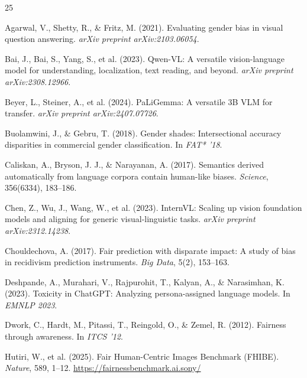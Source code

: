 \documentclass{article}
\begin{document}

\begin{thebibliography}{25}

Agarwal, V., Shetty, R., \& Fritz, M. (2021).
\newblock Evaluating gender bias in visual question answering.
\newblock \textit{arXiv preprint arXiv:2103.06054}.

Bai, J., Bai, S., Yang, S., et al. (2023).
\newblock Qwen-VL: A versatile vision-language model for understanding, localization, text reading, and beyond.
\newblock \textit{arXiv preprint arXiv:2308.12966}.

Beyer, L., Steiner, A., et al. (2024).
\newblock PaLiGemma: A versatile 3B VLM for transfer.
\newblock \textit{arXiv preprint arXiv:2407.07726}.

Buolamwini, J., \& Gebru, T. (2018).
\newblock Gender shades: Intersectional accuracy disparities in commercial gender classification.
\newblock In \textit{FAT* '18}.

Caliskan, A., Bryson, J. J., \& Narayanan, A. (2017).
\newblock Semantics derived automatically from language corpora contain human-like biases.
\newblock \textit{Science}, 356(6334), 183--186.

Chen, Z., Wu, J., Wang, W., et al. (2023).
\newblock InternVL: Scaling up vision foundation models and aligning for generic visual-linguistic tasks.
\newblock \textit{arXiv preprint arXiv:2312.14238}.

Chouldechova, A. (2017).
\newblock Fair prediction with disparate impact: A study of bias in recidivism prediction instruments.
\newblock \textit{Big Data}, 5(2), 153--163.

Deshpande, A., Murahari, V., Rajpurohit, T., Kalyan, A., \& Narasimhan, K. (2023).
\newblock Toxicity in ChatGPT: Analyzing persona-assigned language models.
\newblock In \textit{EMNLP 2023}.

Dwork, C., Hardt, M., Pitassi, T., Reingold, O., \& Zemel, R. (2012).
\newblock Fairness through awareness.
\newblock In \textit{ITCS '12}.

Hutiri, W., et al. (2025).
\newblock Fair Human-Centric Images Benchmark (FHIBE).
\newblock \textit{Nature}, 589, 1--12.
\newblock \url{https://fairnessbenchmark.ai.sony/}


\end{thebibliography}
\end{document}
